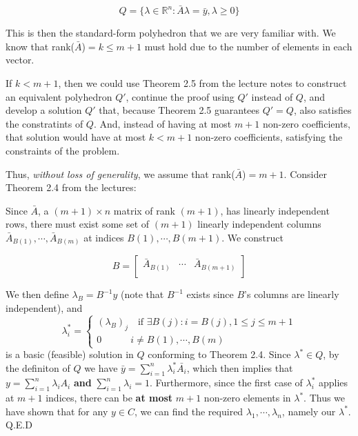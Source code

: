 \documentclass[11pt]{article}
\begin{document}
$$
Q=\bigl\{\lambda\in\mathbb{R}^n:\bar{A}\lambda=\bar{y}, \lambda\geq 0\bigr\}
$$

This is then the standard-form polyhedron that we are very familiar with. We know that rank($\bar{A}$)$=k\leq m+1$ must hold due to the number of elements in each vector. 

If $k<m+1$, then we could use Theorem 2.5 from the lecture notes to construct an equivalent polyhedron $Q'$, continue the proof using $Q'$ instead of $Q$, and develop a solution $Q'$ that, because Theorem 2.5 guarantees $Q'=Q$, also satisfies the constratints of $Q$. And, instead of having at most $m+1$ non-zero coefficients, that solution would have at most $k<m+1$ non-zero coefficients, satisfying the constraints of the problem. 

Thus, \emph{without loss of generality}, we assume that rank($\bar{A}$)$=m+1$. Consider Theorem 2.4 from the lectures:

\bigskip

\noindent{}

Since $\bar{A}$, a $(m+1)\times n$ matrix of rank $(m+1)$, has linearly independent rows, there must exist some set of $(m+1)$ linearly independent columns $\bar{A}_{B(1)},\cdots, \bar{A}_{B(m)}$ at indices $B(1),\cdots, B(m+1)$. We construct

$$
B=\begin{bmatrix}
\bar{A}_{B(1)} & \cdots & \bar{A}_{B(m+1)} \\
\end{bmatrix}
$$

We then define $\lambda_B=B^{-1}y$ (note that $B^{-1}$ exists since $B$'s columns are linearly independent), and
$$
\lambda_i^* = \begin{cases}
(\lambda_B)_j\quad \text{if }\exists B(j):i=B(j), 1\leq j\leq m+1\\
0\quad\quad\quad i\neq B(1), \cdots, B(m)
\end{cases}
$$
is a basic (feasible) solution in $Q$ conforming to Theorem 2.4. Since $\lambda^*\in Q$, by the definiton of $Q$ we have $\bar{y}=\sum_{i=1}^n\lambda_i^*\bar{A_i}$, which then implies that $y=\sum_{i=1}^n\lambda_iA_i$ \textbf{and} $\sum_{i=1}^n\lambda_i=1$. Furthermore, since the first case of $\lambda_i^*$ applies at $m+1$ indices, there can be \textbf{at most} $m+1$ non-zero elements in $\lambda^*$. Thus we have shown that for any $y\in C$, we can find the required $\lambda_1,\cdots, \lambda_n$, namely our $\lambda^*$. Q.E.D
\end{document}
